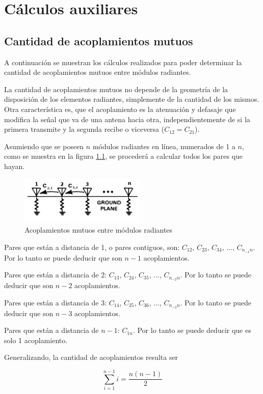 
\chapter{Cálculos auxiliares} %

\label{AppendixA} %


\section{Cantidad de acoplamientos mutuos}

A continuación se muestran los cálculos realizados para poder determinar la cantidad de acoplamientos mutuos entre módulos
radiantes.

La cantidad de acoplamientos mutuos no depende de la geometría de la disposición de los elementos radiantes, simplemente de 
la cantidad de los mismos. Otra característica es, que el acoplamiento es la atenuación y defasaje que modifica la señal 
que va de una antena hacia otra, independientemente de si la primera transmite y la segunda recibe o viceversa 
($C_{12} = C_{21}$).

Asumiendo que se poseen $n$ módulos radiantes en línea, numerados de 1 a $n$, como se muestra en la figura \ref{fig:RmsInARow},
se procederá a calcular todos los pares que hayan. 

\begin{figure}[H]
 \centering
 \includegraphics[width=6cm]{gfx/mutualCoupling.png}
 \caption{Acoplamientos mutuos entre módulos radiantes}
 \label{fig:RmsInARow}
\end{figure}

Pares que están a distancia de 1, o pares contiguos, son: $C_{12}$, $C_{23}$, $C_{34}$, ..., $C_{n_{-1}n}$. Por lo tanto se puede deducir
que son $n - 1$ acoplamientos.

Pares que están a distancia de 2: $C_{13}$, $C_{24}$, $C_{35}$, ..., $C_{n_{-2}n}$. Por lo tanto se puede deducir que son $n - 2$ acoplamientos.

Pares que están a distancia de 3: $C_{14}$, $C_{25}$, $C_{36}$, ..., $C_{n_{-3}n}$. Por lo tanto se puede deducir que son $n - 3$ acoplamientos.

Pares que están a distancia de $n - 1$: $C_{1n}$. Por lo tanto se puede deducir que es solo 1 acoplamiento. 

Generalizando, la cantidad de acoplamientos resulta ser 

\begin{equation}\label{eq:amountMutCoupling}
	\sum_{i = 1}^{n-1} i = \dfrac{n(n-1)}{2}
\end{equation}
